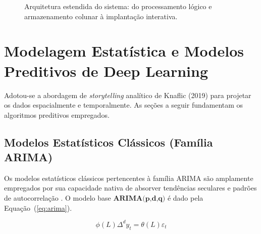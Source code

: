 \documentclass[12pt]{article}
\begin{document}
\begin{figure}[!ht]
{
}
\caption{Arquitetura estendida do sistema: do processamento lógico e armazenamento colunar à implantação interativa.}
\label{fig:arquitetura}
\end{figure}


\section{Modelagem Estatística e Modelos Preditivos de Deep Learning}

Adotou-se a abordagem de \textit{storytelling} analítico de Knaflic (2019) para projetar os dados espacialmente e temporalmente. As seções a seguir fundamentam os algoritmos preditivos empregados.

\subsection{Modelos Estatísticos Clássicos (Família ARIMA)}
Os modelos estatísticos clássicos pertencentes à família ARIMA são amplamente empregados por sua capacidade nativa de absorver tendências seculares e padrões de autocorrelação \cite{box1970time}. O modelo base $\textbf{ARIMA(p,d,q)}$ é dado pela Equação~(\ref{eq:arima}).

\begin{equation}
\phi(L)\Delta^{d} y_{t} = \theta(L)\varepsilon_{t}
\label{eq:arima}
\end{equation}
\end{document}
